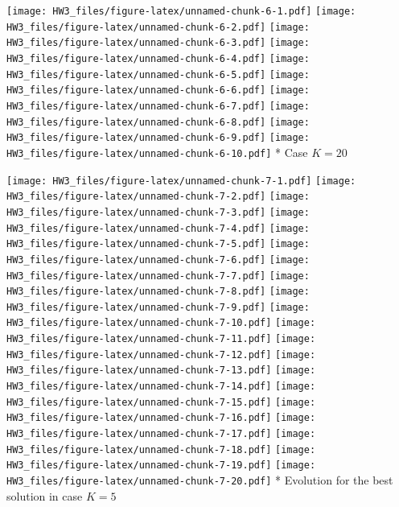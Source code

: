 \documentclass[]{article}
\newenvironment{Shaded}{\begin{snugshade}}{\end{snugshade}}
\newcommand{\KeywordTok}[1]{\textcolor[rgb]{0.13,0.29,0.53}{\textbf{#1}}}
\newcommand{\DecValTok}[1]{\textcolor[rgb]{0.00,0.00,0.81}{#1}}
\newcommand{\ControlFlowTok}[1]{\textcolor[rgb]{0.13,0.29,0.53}{\textbf{#1}}}
\newcommand{\OperatorTok}[1]{\textcolor[rgb]{0.81,0.36,0.00}{\textbf{#1}}}
\newcommand{\NormalTok}[1]{#1}
\begin{document}
\texttt{[image: HW3\_files/figure-latex/unnamed-chunk-6-1.pdf]}
\texttt{[image: HW3\_files/figure-latex/unnamed-chunk-6-2.pdf]}
\texttt{[image: HW3\_files/figure-latex/unnamed-chunk-6-3.pdf]}
\texttt{[image: HW3\_files/figure-latex/unnamed-chunk-6-4.pdf]}
\texttt{[image: HW3\_files/figure-latex/unnamed-chunk-6-5.pdf]}
\texttt{[image: HW3\_files/figure-latex/unnamed-chunk-6-6.pdf]}
\texttt{[image: HW3\_files/figure-latex/unnamed-chunk-6-7.pdf]}
\texttt{[image: HW3\_files/figure-latex/unnamed-chunk-6-8.pdf]}
\texttt{[image: HW3\_files/figure-latex/unnamed-chunk-6-9.pdf]}
\texttt{[image: HW3\_files/figure-latex/unnamed-chunk-6-10.pdf]} * Case
\(K = 20\)

\begin{Shaded}
\end{Shaded}

\texttt{[image: HW3\_files/figure-latex/unnamed-chunk-7-1.pdf]}
\texttt{[image: HW3\_files/figure-latex/unnamed-chunk-7-2.pdf]}
\texttt{[image: HW3\_files/figure-latex/unnamed-chunk-7-3.pdf]}
\texttt{[image: HW3\_files/figure-latex/unnamed-chunk-7-4.pdf]}
\texttt{[image: HW3\_files/figure-latex/unnamed-chunk-7-5.pdf]}
\texttt{[image: HW3\_files/figure-latex/unnamed-chunk-7-6.pdf]}
\texttt{[image: HW3\_files/figure-latex/unnamed-chunk-7-7.pdf]}
\texttt{[image: HW3\_files/figure-latex/unnamed-chunk-7-8.pdf]}
\texttt{[image: HW3\_files/figure-latex/unnamed-chunk-7-9.pdf]}
\texttt{[image: HW3\_files/figure-latex/unnamed-chunk-7-10.pdf]}
\texttt{[image: HW3\_files/figure-latex/unnamed-chunk-7-11.pdf]}
\texttt{[image: HW3\_files/figure-latex/unnamed-chunk-7-12.pdf]}
\texttt{[image: HW3\_files/figure-latex/unnamed-chunk-7-13.pdf]}
\texttt{[image: HW3\_files/figure-latex/unnamed-chunk-7-14.pdf]}
\texttt{[image: HW3\_files/figure-latex/unnamed-chunk-7-15.pdf]}
\texttt{[image: HW3\_files/figure-latex/unnamed-chunk-7-16.pdf]}
\texttt{[image: HW3\_files/figure-latex/unnamed-chunk-7-17.pdf]}
\texttt{[image: HW3\_files/figure-latex/unnamed-chunk-7-18.pdf]}
\texttt{[image: HW3\_files/figure-latex/unnamed-chunk-7-19.pdf]}
\texttt{[image: HW3\_files/figure-latex/unnamed-chunk-7-20.pdf]} *
Evolution for the best solution in case \(K = 5\)
\end{document}
